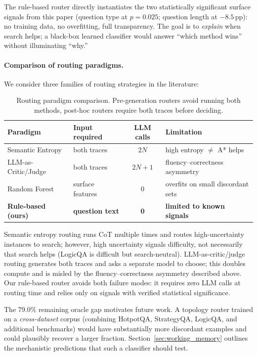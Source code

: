 \documentclass{article}
\begin{document}
The rule-based router directly instantiates the two statistically significant surface signals from this paper (question type at $p=0.025$; question length at $-8.5$\,pp): no training data, no overfitting, full transparency. The goal is to \emph{explain} when search helps; a black-box learned classifier would answer ``which method wins'' without illuminating ``why.''

\paragraph{Comparison of routing paradigms.}
We consider three families of routing strategies in the literature:

\begin{table}[h]
\centering
\caption{Routing paradigm comparison. Pre-generation routers avoid running both methods, post-hoc routers require both traces before deciding.}
\label{tab:routing_paradigms}
\small
\begin{tabular}{llcl}
\toprule
Paradigm & Input required & LLM calls & Limitation \\
\midrule
Semantic Entropy & both traces & $2N$ & high entropy $\neq$ A* helps \\
LLM-as-Critic/Judge & both traces & $2N + 1$ & fluency--correctness asymmetry \\
Random Forest & surface features & 0 & overfits on small discordant sets \\
\textbf{Rule-based (ours)} & \textbf{question text} & \textbf{0} & \textbf{limited to known signals} \\
\bottomrule
\end{tabular}
\end{table}

Semantic entropy routing \citep{kossen2024semanticentropyprobesrobust} runs CoT multiple times and routes high-uncertainty instances to search; however, high uncertainty signals difficulty, not necessarily that search helps (LogicQA is difficult but search-neutral). LLM-as-critic/judge routing \citep{zheng2023judgingllmasajudgemtbenchchatbot} generates both traces and asks a separate model to choose; this doubles compute and is misled by the fluency--correctness asymmetry described above. Our rule-based router avoids both failure modes: it requires zero LLM calls at routing time and relies only on signals with verified statistical significance.

The 79.0\% remaining oracle gap motivates future work. A topology router trained on a \emph{cross-dataset} corpus (combining HotpotQA, StrategyQA, LogicQA, and additional benchmarks) would have substantially more discordant examples and could plausibly recover a larger fraction. Section~\ref{sec:working_memory} outlines the mechanistic predictions that such a classifier should test.
\end{document}
